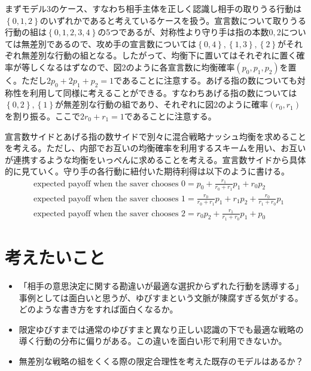 \documentclass{jsarticle}
\begin{document}
まずモデル3のケース、すなわち相手主体を正しく認識し相手の取りうる行動は$\left\{0,1,2\right\}$のいずれかであると考えているケースを扱う。宣言数について取りうる行動の組は$\left\{ 0,1,2,3,4\right\}$の5つであるが、対称性より守り手は指の本数$0,2$については無差別であるので、攻め手の宣言数については$\left\{ 0,4 \right\},\left\{ 1,3 \right\},\left\{ 2\right\} $がそれぞれ無差別な行動の組となる。したがって、均衡下に置いてはそれぞれに置く確率が等しくなるはずなので、図2のように各宣言数に均衡確率$(p_0, p_1, p_2)$を置く。ただし$2p_0 + 2p_1 + p_2 = 1$であることに注意する。あげる指の数についても対称性を利用して同様に考えることができる。すなわちあげる指の数については$\left\{ 0,2 \right\}, \left\{ 1 \right\}$が無差別な行動の組であり、それぞれに図2のように確率$(r_0, r_1)$を割り振る。ここで$2r_0 + r_1 = 1$であることに注意する。

宣言数サイドとあげる指の数サイドで別々に混合戦略ナッシュ均衡を求めることを考える。ただし、内部でお互いの均衡確率を利用するスキームを用い、お互いが連携するような均衡をいっぺんに求めることを考える。宣言数サイドから具体的に見ていく。守り手の各行動に紐付いた期待利得は以下のように書ける。
\begin{align*}
	&\text{expected payoff when the saver chooses 0} = p_0 + \frac{r_1}{r_0 + r_1}p_1 + r_0p_2\\
	&\text{expected payoff when the saver chooses 1} = \frac{r_0}{r_0 + r_1}p_1 + r_1p_2 + \frac{r_0}{r_1 + r_0}p_1\\
	&\text{expected payoff when the saver chooses 2} = r_0p_2 + \frac{r_1}{r_1  + r_0}p_1 + p_0
\end{align*}


\section{考えたいこと}
\begin{itemize}
	\item 「相手の意思決定に関する勘違いが最適な選択からずれた行動を誘導する」事例としては面白いと思うが、ゆびすまという文脈が陳腐すぎる気がする。どのような書き方をすれば面白くなるか。
	\item 限定ゆびすまでは通常のゆびすまと異なり正しい認識の下でも最適な戦略の導く行動の分布に偏りがある。この違いを面白い形で利用できないか。
	\item 無差別な戦略の組をくくる際の限定合理性を考えた既存のモデルはあるか？
\end{itemize}
\end{document}
